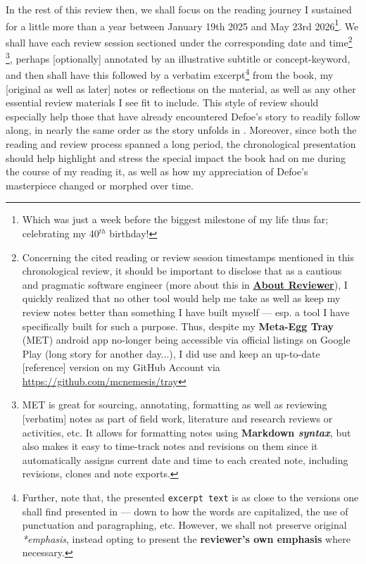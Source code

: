 \documentclass[a4paper]{article}
\begin{document}
In the rest of this review then, we shall focus on the reading journey I sustained for a little more than a year between January 19th 2025 and May 23rd 2026\footnote{Which was just a week before the biggest milestone of my life thus far; celebrating my 40$^{th}$ birthday!}. We shall have each review session sectioned under the corresponding date and time\footnote{Concerning the cited reading or review session timestamps mentioned in this chronological review, it should be important to disclose that as a cautious and pragmatic software engineer (more about this in \textbf{\hyperref[SECABOUT]{About Reviewer}}), I quickly realized that no other tool would help me take as well as keep my review notes better than something I have built myself --- esp. a tool I have specifically built for such a purpose. Thus, despite my \textbf{Meta-Egg Tray} (MET) android app no-longer being accessible via official listings on Google Play (long story for another day...), I did use and keep an up-to-date [reference] version on my GitHub Account via \url{https://github.com/mcnemesis/tray}} \footnote{MET is great for sourcing, annotating, formatting as well as reviewing [verbatim] notes as part of field work, literature and research reviews or activities, etc. It allows for formatting notes using \textbf{Markdown \textit{syntax}}, but also makes it easy to time-track notes and revisions on them since it automatically assigns current date and time to each created note, including revisions, clones and note exports.}, perhaps [optionally] annotated by an illustrative subtitle or concept-keyword, and then shall have this followed by a verbatim excerpt\footnote{Further, note that, the presented \texttt{excerpt text} is as close to the versions one shall find presented in \cite{Defoe2007} --- down to how the words are capitalized, the use of punctuation and paragraphing, etc. However, we shall not preserve original \textit{*emphasis}, instead opting to present the \textbf{reviewer's own emphasis} where necessary.} from the book, my [original as well as later] notes or reflections on the material, as well as any other essential review materials I see fit to include. This style of review should especially help those that have already encountered Defoe's story to readily follow along, in nearly the same order as the story unfolds in \cite{Defoe2007}. Moreover, since both the reading and review process spanned a long period, the chronological presentation should help highlight and stress the special impact the book had on me during the course of my reading it, as well as how my appreciation of Defoe's masterpiece changed or morphed over time. 
\end{document}
